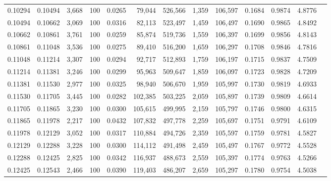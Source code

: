 \begin{tabular}{rrrrrrrrrrrrr}
0.10294 & 0.10494 & 3,668 & 100 &                                     0.0265 &  79,044 & 526,566 &   1,359 & 106,597 & 0.1684 & 0.9874 & 4.8776 \\
0.10494 & 0.10662 & 3,069 & 100 &                                     0.0316 &  82,113 & 523,497 &   1,459 & 106,497 & 0.1690 & 0.9865 & 4.8492 \\
0.10662 & 0.10861 & 3,761 & 100 &                                     0.0259 &  85,874 & 519,736 &   1,559 & 106,397 & 0.1699 & 0.9856 & 4.8143 \\
0.10861 & 0.11048 & 3,536 & 100 &                                     0.0275 &  89,410 & 516,200 &   1,659 & 106,297 & 0.1708 & 0.9846 & 4.7816 \\
0.11048 & 0.11214 & 3,307 & 100 &                                     0.0294 &  92,717 & 512,893 &   1,759 & 106,197 & 0.1715 & 0.9837 & 4.7509 \\
0.11214 & 0.11381 & 3,246 & 100 &                                     0.0299 &  95,963 & 509,647 &   1,859 & 106,097 & 0.1723 & 0.9828 & 4.7209 \\
0.11381 & 0.11530 & 2,977 & 100 &                                     0.0325 &  98,940 & 506,670 &   1,959 & 105,997 & 0.1730 & 0.9819 & 4.6933 \\
0.11530 & 0.11705 & 3,445 & 100 &                                     0.0282 & 102,385 & 503,225 &   2,059 & 105,897 & 0.1739 & 0.9809 & 4.6614 \\
0.11705 & 0.11865 & 3,230 & 100 &                                     0.0300 & 105,615 & 499,995 &   2,159 & 105,797 & 0.1746 & 0.9800 & 4.6315 \\
0.11865 & 0.11978 & 2,217 & 100 &                                     0.0432 & 107,832 & 497,778 &   2,259 & 105,697 & 0.1751 & 0.9791 & 4.6109 \\
0.11978 & 0.12129 & 3,052 & 100 &                                     0.0317 & 110,884 & 494,726 &   2,359 & 105,597 & 0.1759 & 0.9781 & 4.5827 \\
0.12129 & 0.12288 & 3,228 & 100 &                                     0.0300 & 114,112 & 491,498 &   2,459 & 105,497 & 0.1767 & 0.9772 & 4.5528 \\
0.12288 & 0.12425 & 2,825 & 100 &                                     0.0342 & 116,937 & 488,673 &   2,559 & 105,397 & 0.1774 & 0.9763 & 4.5266 \\
0.12425 & 0.12543 & 2,466 & 100 &                                     0.0390 & 119,403 & 486,207 &   2,659 & 105,297 & 0.1780 & 0.9754 & 4.5038 \\

\end{tabular}
